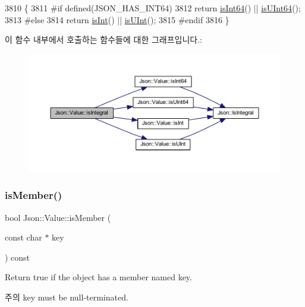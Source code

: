 \begin{DoxyCode}
3810                              \{
3811 \textcolor{preprocessor}{#if defined(JSON\_HAS\_INT64)}
3812   \textcolor{keywordflow}{return} \hyperlink{class_json_1_1_value_a4a81fb3c3acdbb68b2e2f30836a4f53e}{isInt64}() || \hyperlink{class_json_1_1_value_a883576e35cb03a785258edb56777a2de}{isUInt64}();
3813 \textcolor{preprocessor}{#else}
3814   \textcolor{keywordflow}{return} \hyperlink{class_json_1_1_value_aff51d8b52979ca06cf9d909accd5f695}{isInt}() || \hyperlink{class_json_1_1_value_abdda463d3269015f883587349726cfbc}{isUInt}();
3815 \textcolor{preprocessor}{#endif}
3816 \}
\end{DoxyCode}
이 함수 내부에서 호출하는 함수들에 대한 그래프입니다.\+:\nopagebreak
\begin{figure}[H]
\begin{center}
\leavevmode
\includegraphics[width=350pt]{class_json_1_1_value_ab6798954f6e80281cf22708ef45198a7_cgraph}
\end{center}
\end{figure}
\mbox{\label{class_json_1_1_value_ad6d4df2227321bab05e86667609a7fad}} 
\subsubsection{\texorpdfstring{is\+Member()}{isMember()}\hspace{0.1cm}{\footnotesize\ttfamily [1/3]}}
{\footnotesize\ttfamily bool Json\+::\+Value\+::is\+Member (\begin{DoxyParamCaption}\item[{const char $\ast$}]{key }\end{DoxyParamCaption}) const}

Return true if the object has a member named key. \begin{DoxyNote}{주의}
\textquotesingle{}key\textquotesingle{} must be null-\/terminated. 
\end{DoxyNote}


